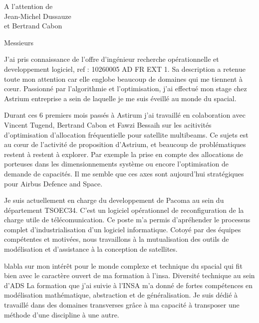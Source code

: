 \documentclass[12pt]{lettre}
\begin{document}
\begin{letter}{A l'attention de\\Jean-Michel Dussauze\\et Bertrand Cabon}
\address{Victor Cameo Ponz\\16 rue Payras\\31000 Toulouse}
\nofax

\opening{Messieurs}
{%
J'ai pris connaissance de l'offre d'ingénieur recherche opérationnelle et
developpement logiciel, ref : 10260005 AD FR EXT 1.
Sa description a retenue toute mon attention car elle englobe beaucoup de
domaines qui me tiennent à c\oe{}ur.
Passionné par l'algorithmie et l'optimisation, j'ai effectué mon stage
chez Astrium entreprise a sein de laquelle je me suis éveillé au monde du spacial.
}

{%
Durant ces 6 premiers mois passés à Astirum j'ai travaillé en colaboration
avec Vincent Tugend, Bertrand Cabon et Fawzi Bessaih sur les acitivités
d'optimisation d'allocation fréquentielle pour satellite multibeams.
Ce sujets est au cœur de l'activité de proposition d'Astrium,
et beaucoup de problématiques restent à restent à explorer.
Par exemple la prise en compte des allocations de porteuses dans les
dimensionnements système ou encore l'optimisation de demande de capacités.
Il me semble que ces axes sont aujourd'hui stratégiques pour Airbus Defence and Space.
}

{%
Je suis actuellement en charge du developpement de Pacoma au sein
du département TSOEC34.
C'est un logiciel opérationnel de reconfiguration de la charge utile de
télécomunication.
Ce poste m'a permis d'apréhender le processus complet d'industrialisation d'un
logiciel informatique.
Cotoyé par des équipes compétentes et motivées, nous travaillons à la
mutualisation des outils de modélisation et d'assistance à la conception de
satellites.
}

{%
blabla sur mon intérêt pour le monde complexe et technique du spacial qui fit bien avec le caractère ouvert de ma formation à l'insa. Diversité technique au sein d'ADS
La formation que j'ai suivie à l'INSA m'a donné de fortes compétences en
modélisation mathématique, abstraction et de généralisation.
Je suis dédié à travaillé dans des domaines transverses grâce à ma
capacité à transposer une méthode d'une discipline à une autre.
}


\end{letter}
\end{document}
